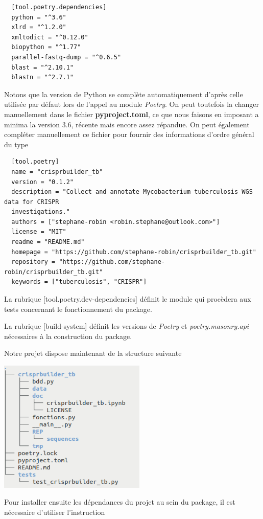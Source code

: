 \documentclass[twoside,a4paper,11pt,frenchb,openany]{report}
\begin{document}
\begin{verbatim}  [tool.poetry.dependencies]
  python = "^3.6"
  xlrd = "^1.2.0"
  xmltodict = "^0.12.0"
  biopython = "^1.77"
  parallel-fastq-dump = "^0.6.5"
  blast = "^2.10.1"
  blastn = "^2.7.1"
\end{verbatim}

Notons que la version de Python se complète automatiquement d'après celle utilisée par défaut lors de l'appel au module \textit{Poetry}. On peut toutefois la changer manuellement dans le fichier \textbf{pyproject.toml}, ce que nous faisons en imposant a minima la version 3.6, récente mais encore assez répandue. On peut également compléter manuellement ce fichier pour fournir des informations d'ordre général du type

\begin{verbatim}  [tool.poetry]
  name = "crisprbuilder_tb"
  version = "0.1.2"
  description = "Collect and annotate Mycobacterium tuberculosis WGS data for CRISPR 
  investigations."
  authors = ["stephane-robin <robin.stephane@outlook.com>"]
  license = "MIT"
  readme = "README.md"
  homepage = "https://github.com/stephane-robin/crisprbuilder_tb.git"
  repository = "https://github.com/stephane-robin/crisprbuilder_tb.git"
  keywords = ["tuberculosis", "CRISPR"]\end{verbatim}

La rubrique [tool.poetry.dev-dependencies] définit le module qui procèdera aux tests concernant le fonctionnement du package.

La rubrique [build-system] définit les versions de \textit{Poetry} et \textit{poetry.masonry.api} nécessaires à la construction du package.

Notre projet dispose maintenant de la structure suivante

\includegraphics[width=7cm]{crispr_etape2-1.png}

Pour installer ensuite les dépendances du projet au sein du package, il est nécessaire d’utiliser l’instruction
\end{document}

